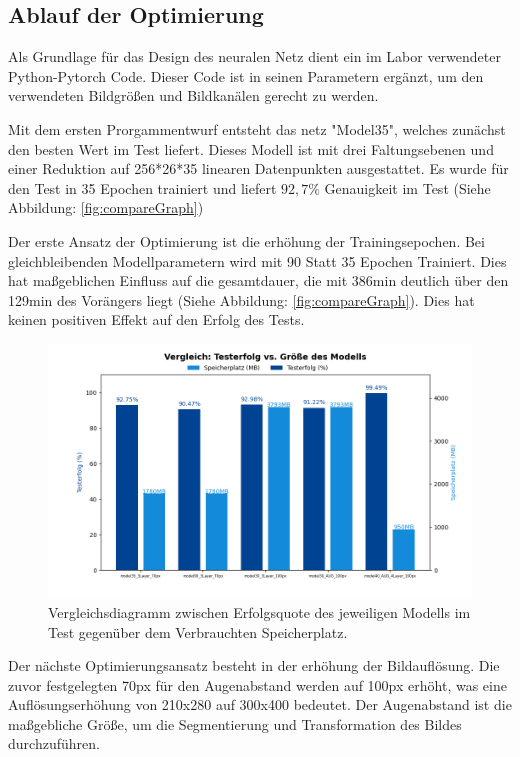 \documentclass[journal,twoside,web]{ieeecolor}
\begin{document}
\subsection{Ablauf der Optimierung}
Als Grundlage für das Design des neuralen Netz dient ein im Labor verwendeter Python-Pytorch Code. Dieser Code ist in seinen Parametern ergänzt, um den verwendeten Bildgrößen und Bildkanälen gerecht zu werden. 

Mit dem ersten Prorgammentwurf entsteht das netz "Model35", welches zunächst den besten Wert im Test liefert. Dieses Modell ist mit drei Faltungsebenen und einer Reduktion auf 256*26*35 linearen Datenpunkten ausgestattet.
Es wurde für den Test in 35 Epochen trainiert und liefert $92,7\%$ Genauigkeit im Test (Siehe Abbildung: \ref{fig:compareGraph})

Der erste Ansatz der Optimierung ist die erhöhung der Trainingsepochen. Bei gleichbleibenden Modellparametern wird mit 90 Statt 35 Epochen Trainiert.
Dies hat maßgeblichen Einfluss auf die gesamtdauer, die mit 386min deutlich über den 129min des Vorängers liegt (Siehe Abbildung: \ref{fig:compareGraph}). Dies hat keinen positiven Effekt auf den Erfolg des Tests.

\begin{figure}[H]
    \centerline{\includegraphics[width=\columnwidth]{Erfolg_Groesse.png}}
    \caption{Vergleichsdiagramm zwischen Erfolgsquote des jeweiligen Modells im Test gegenüber dem Verbrauchten Speicherplatz.}
    \label{fig:compareSize}
\end{figure}

Der nächste Optimierungsansatz besteht in der erhöhung der Bildauflösung. Die zuvor festgelegten 70px für den Augenabstand werden auf 100px erhöht, was eine Auflösungserhöhung von 210x280 auf 300x400 bedeutet.
Der Augenabstand ist die maßgebliche Größe, um die Segmentierung und Transformation des Bildes durchzuführen.
\end{document}
